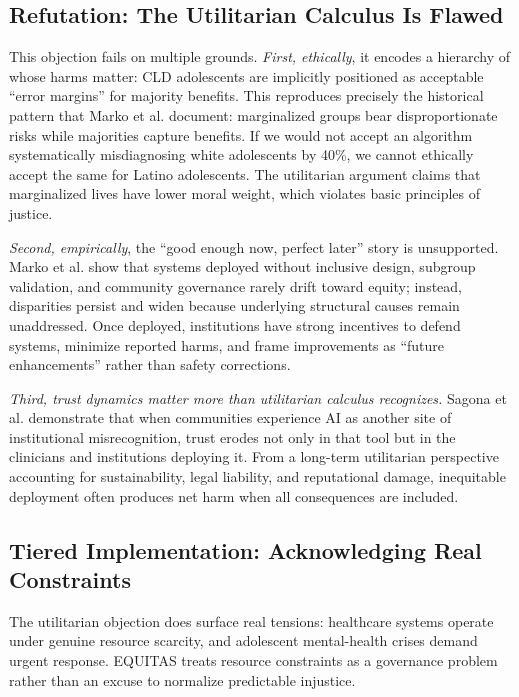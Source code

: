 \documentclass[12pt,a4paper]{article}
\begin{document}
\subsection{Refutation: The Utilitarian Calculus Is Flawed}

This objection fails on multiple grounds. \textit{First, ethically}, it encodes a hierarchy of whose harms matter: CLD adolescents are implicitly positioned as acceptable ``error margins'' for majority benefits. This reproduces precisely the historical pattern that Marko et al. document: marginalized groups bear disproportionate risks while majorities capture benefits.\cite{marko2025} If we would not accept an algorithm systematically misdiagnosing white adolescents by 40\%, we cannot ethically accept the same for Latino adolescents. The utilitarian argument claims that marginalized lives have lower moral weight, which violates basic principles of justice.\cite{garcia_ed415}

\textit{Second, empirically}, the ``good enough now, perfect later'' story is unsupported. Marko et al. show that systems deployed without inclusive design, subgroup validation, and community governance rarely drift toward equity; instead, disparities persist and widen because underlying structural causes remain unaddressed.\cite{marko2025} Once deployed, institutions have strong incentives to defend systems, minimize reported harms, and frame improvements as ``future enhancements'' rather than safety corrections.\cite{marko2025}

\textit{Third, trust dynamics matter more than utilitarian calculus recognizes.} Sagona et al. demonstrate that when communities experience AI as another site of institutional misrecognition, trust erodes not only in that tool but in the clinicians and institutions deploying it.\cite{sagona2025} From a long-term utilitarian perspective accounting for sustainability, legal liability, and reputational damage, inequitable deployment often produces net harm when all consequences are included.\cite{sagona2025}

\subsection{Tiered Implementation: Acknowledging Real Constraints}

The utilitarian objection does surface real tensions: healthcare systems operate under genuine resource scarcity, and adolescent mental-health crises demand urgent response.\cite{garcia_ed415} EQUITAS treats resource constraints as a governance problem rather than an excuse to normalize predictable injustice.
\end{document}

